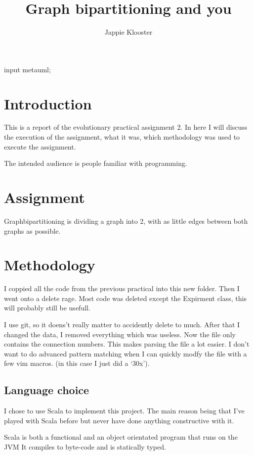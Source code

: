 \documentclass{article}
\begin{document}
\begin{empfile}
\begin{empcmds}
input metauml;
\end{empcmds}
\author{Jappie Klooster}
\title{Graph bipartitioning and you}
\maketitle

\section{Introduction}
This is a report of the evolutionary practical assignment 2.
In here I will discuss the execution of the assignment, what it was, which
methodology was used to execute the assignment.

The intended audience is people familiar with programming.

\section{Assignment}
Graphbipartitioning is dividing a graph into 2, with as little edges between
both graphs as possible.

\section{Methodology}
I coppied all the code from the previous practical into this new folder.
Then I went onto a delete rage. Most code was deleted except the Expirment
class, this will probably still be usefull.

I use git, so it doens't really matter to accidently delete to much. After
that I changed the data, I removed everything which was useless. Now the file
only contains the connection numbers. This makes parsing the file a lot
easier. I don't want to do advanced pattern matching when I can quickly modfy
the file with a few vim macros. (in this case I just did a `30x').

\subsection{Language choice}
I chose to use Scala to implement this project. The main reason being that I've
played with Scala before but never have done anything constructive with it.

Scala is both a functional and an object orientated program that runs on the JVM
It compiles to byte-code and is statically typed.


\end{empfile}
\end{document}
